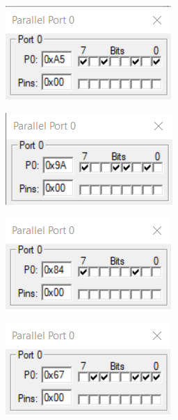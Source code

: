 \documentclass{lab_sheet}
\begin{document}
\begin{figure}[H]
\begin{subfigure}{.5\textwidth}
  \centering
  \includegraphics[frame,width=.8\linewidth]{../Figures/1_6_g.png}   
  \caption{}
  \label{fig:prob6b-d}
\end{subfigure}
\begin{subfigure}{.5\textwidth}
  \centering
  \includegraphics[frame,width=.8\linewidth]{../Figures/1_6_f.png}  
  \label{fig:prob6b-e}
  \caption{}
\end{subfigure}
\begin{subfigure}{.5\textwidth}
  \centering
  \includegraphics[frame,width=.8\linewidth]{../Figures/1_6_e.png}  
  \label{fig:prob6b-f}
  \caption{}
\end{subfigure}
\begin{subfigure}{.5\textwidth}
  \centering
    \includegraphics[frame,width=.8\linewidth]{../Figures/1_6_d.png}  

\end{subfigure}
\end{figure}
\end{document}
